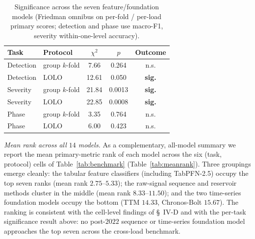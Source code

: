 \documentclass[journal]{IEEEtran}
\begin{document}
\begin{table}[!t]
\caption{Significance across the seven feature/foundation models (Friedman omnibus on per-fold / per-load
primary scores; detection and phase use macro-F1, severity within-one-level accuracy).}
\label{tab:significance}
\centering
\begin{tabular}{@{}llccc@{}}
\toprule
Task & Protocol & $\chi^2$ & $p$ & Outcome \\
\midrule
Detection & group $k$-fold & 7.66 & 0.264 & n.s. \\
Detection & LOLO & 12.61 & 0.050 & \textbf{sig.} \\
Severity & group $k$-fold & 21.84 & 0.0013 & \textbf{sig.} \\
Severity & LOLO & 22.85 & 0.0008 & \textbf{sig.} \\
Phase & group $k$-fold & 3.35 & 0.764 & n.s. \\
Phase & LOLO & 6.00 & 0.423 & n.s. \\
\bottomrule
\end{tabular}
\end{table}

\emph{Mean rank across all $14$ models.} As a complementary, all-model summary we report
the mean primary-metric rank of each model across the six (task, protocol) cells of
Table~\ref{tab:benchmark} (Table~\ref{tab:meanrank}). Three groupings emerge cleanly:
the tabular feature classifiers (including TabPFN-2.5) occupy the top seven ranks
(mean rank $2.75$--$5.33$); the raw-signal sequence and reservoir methods cluster in the
middle (mean rank $8.33$--$11.50$); and the two time-series foundation models occupy the
bottom (TTM $14.33$, Chronos-Bolt $15.67$). The ranking is consistent with the cell-level
findings of \S~IV-D and with the per-task significance result above: no post-$2022$
sequence or time-series foundation model approaches the top seven across the cross-load
benchmark.
\end{document}
